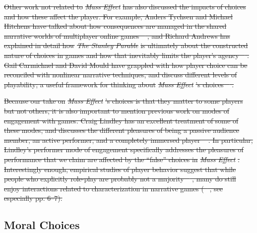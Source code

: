 \documentclass[arts,article,submit,moreauthors,pdftex,10pt,a4paper]{Definitions/mdpi}
\providecommand{\DIFdel}[1]{{\protect\color{red}\sout{#1}}}                      %
\providecommand{\DIFdelend}{} %
\begin{document}
\DIFdel{Other work not related to }\emph{\DIFdel{Mass Effect}} %
\DIFdel{has also discussed the impacts of choices and how these affect the player.
For example, Anders Tychsen and Michael Hitchens have talked about how consequences are managed in the shared narrative worlds of multiplayer online games \mbox{%
\citep{tychsen2006ghost}}\hspace{0pt}%
, and Richard Andrews has explained in detail how }\emph{\DIFdel{The Stanley Parable}} %
\DIFdel{is ultimately about the constructed nature of choices in games and how that inevitably limits the player's agency \mbox{%
\citep{andrews2017metagames}}\hspace{0pt}%
.
Gail Carmichael and David Mould have grappled with how player choice can be reconciled with nonlinear narrative techniques, and discuss different levels of playability; a useful framework for thinking about }\emph{\DIFdel{Mass Effect}}%
\DIFdel{'s choices \mbox{%
\citep{carmichael2014chronologically}}\hspace{0pt}%
.
}%

\DIFdel{Because our take on }\emph{\DIFdel{Mass Effect}}%
\DIFdel{'s choices is that they matter to some players but not others, it is also important to mention previous work on modes of engagement with games.
Craig Lindley has an excellent treatment of some of these modes, and discusses the different pleasures of being a passive audience member, an active performer, and a completely immersed player \mbox{%
\citep{lindley2005story}}\hspace{0pt}%
.
In particular, Lindley's performer mode of engagement specifically addresses the pleasures of performance that we claim are affected by the ``false'' choices in }\emph{\DIFdel{Mass Effect}}%
\DIFdel{.
Interestingly enough, empirical studies of player behavior suggest that while people who explicitly role-play are probably not a majority \mbox{%
\citep{lange2014youre}}\hspace{0pt}%
, many do still enjoy interactions related to characterization in narrative games (\mbox{%
\cite{mallon2005stand}}\hspace{0pt}%
, see especially pp. 6--7).
}%

\DIFdelend \subsection{Moral Choices}
\end{document}
